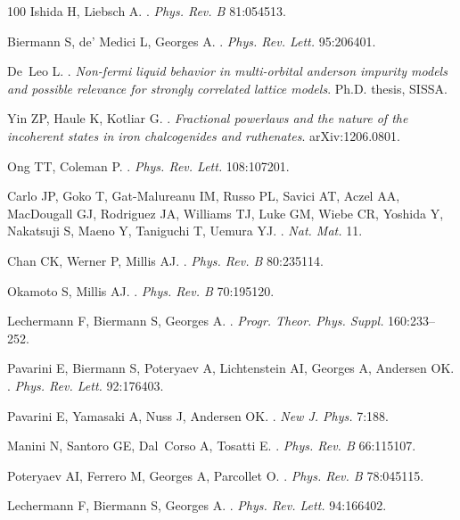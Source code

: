 \documentclass[]{ar2e-changed}%
\begin{document}
\begin{thebibliography}{100}
Ishida H, Liebsch A.
.
\newblock \emph{Phys. Rev. B} 81:054513.

Biermann S, de' Medici L, Georges A.
.
\newblock \emph{Phys. Rev. Lett.} 95:206401.

De~Leo L.
.
\newblock \emph{Non-fermi liquid behavior in multi-orbital anderson impurity
  models and possible relevance for strongly correlated lattice models}.
\newblock Ph.D. thesis, SISSA.

{Yin} ZP, {Haule} K, {Kotliar} G.
.
\newblock \emph{{Fractional powerlaws and the nature of the incoherent states
  in iron chalcogenides and ruthenates}}.
\newblock arXiv:1206.0801.

Ong TT, Coleman P.
.
\newblock \emph{Phys. Rev. Lett.} 108:107201.

Carlo JP, Goko T, Gat-Malureanu IM, Russo PL, Savici AT, Aczel AA, MacDougall
  GJ, Rodriguez JA, Williams TJ, Luke GM, Wiebe CR, Yoshida Y, Nakatsuji S,
  Maeno Y, Taniguchi T, Uemura YJ.
.
\newblock \emph{Nat. Mat.} 11.

Chan CK, Werner P, Millis AJ.
.
\newblock \emph{Phys. Rev. B} 80:235114.

Okamoto S, Millis AJ.
.
\newblock \emph{Phys. Rev. B} 70:195120.

Lechermann F, Biermann S, Georges A.
.
\newblock \emph{Progr. Theor. Phys. Suppl.} 160:233--252.

Pavarini E, Biermann S, Poteryaev A, Lichtenstein AI, Georges A, Andersen OK.
.
\newblock \emph{Phys. Rev. Lett.} 92:176403.

Pavarini E, Yamasaki A, Nuss J, Andersen OK.
.
\newblock \emph{New J. Phys.} 7:188.

Manini N, Santoro GE, Dal~Corso A, Tosatti E.
.
\newblock \emph{Phys. Rev. B} 66:115107.

Poteryaev AI, Ferrero M, Georges A, Parcollet O.
.
\newblock \emph{Phys. Rev. B} 78:045115.

Lechermann F, Biermann S, Georges A.
.
\newblock \emph{Phys. Rev. Lett.} 94:166402.


\end{thebibliography}
\end{document}
